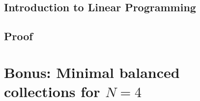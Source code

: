 \documentclass[10pt,a4paper,titlepage]{article}
\theoremstyle{plain}
\theoremstyle{definition}
\begin{document}
\subsection{Introduction to Linear Programming}

\subsection{Proof}

\pagebreak

\vspace{-30pt}

\section*{Bonus: Minimal balanced collections for $N = 4$}\vspace{-6pt}\label{bonus}
\end{document}
